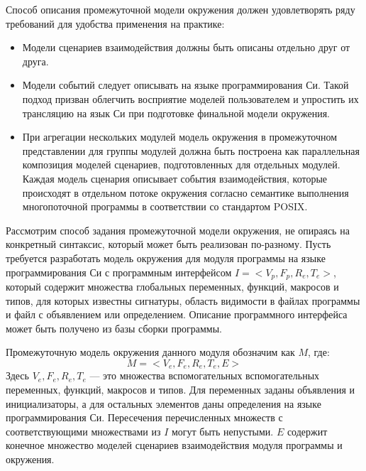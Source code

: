 Способ описания промежуточной модели окружения должен удовлетворять ряду требований для удобства применения на практике:
\begin{itemize}
    \item Модели сценариев взаимодействия должны быть описаны отдельно друг от друга.
    \item Модели событий следует описывать на языке программирования Си. 
    Такой подход призван облегчить восприятие моделей пользователем и упростить их трансляцию на язык Си при подготовке финальной модели окружения.
    \item При агрегации нескольких модулей модель окружения в промежуточном представлении для группы модулей должна быть построена как параллельная композиция моделей сценариев, подготовленных для отдельных модулей.
    Каждая модель сценария описывает события взаимодействия, которые происходят в отдельном потоке окружения согласно семантике выполнения многопоточной программы в соответствии со стандартом POSIX.
\end{itemize}

Рассмотрим способ задания промежуточной модели окружения, не опираясь на конкретный синтаксис, который может быть реализован по-разному.
Пусть требуется разработать модель окружения для модуля программы на языке программирования Си с программным интерфейсом $I = <V_p, F_p, R_e, T_e>$, который содержит множества глобальных переменных, функций, макросов и типов, для которых известны сигнатуры, область видимости в файлах программы и файл с объявлением или определением.
Описание программного интерфейса может быть получено из базы сборки программы.

Промежуточную модель окружения данного модуля обозначим как $M$, где:
\[ M = <V_e, F_e, R_e, T_e, E> \]
Здесь $V_e, F_e, R_e, T_e$ --- это множества вспомогательных вспомогательных переменных, функций, макросов и типов.
Для переменных заданы объявления и инициализаторы, а для остальных элементов даны определения на языке программирования Си.
Пересечения перечисленных множеств с соответствующими множествами из $I$ могут быть непустыми.
$E$ содержит конечное множество моделей сценариев взаимодействия модуля программы и окружения.

